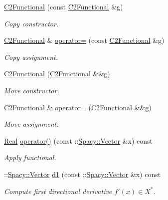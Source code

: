 \begin{DoxyCompactItemize}
\item 
\hyperlink{classSpacy_1_1FEniCS_1_1C2Functional_addb84a06f7f82969c57e5bf1b65f2b68}{C2\-Functional} (const \hyperlink{classSpacy_1_1FEniCS_1_1C2Functional}{C2\-Functional} \&g)
\begin{DoxyCompactList}\small\item\em Copy constructor. \end{DoxyCompactList}\item 
\hyperlink{classSpacy_1_1FEniCS_1_1C2Functional}{C2\-Functional} \& \hyperlink{classSpacy_1_1FEniCS_1_1C2Functional_ab9ff23de1e812f6782b7db6ec01e0f4c}{operator=} (const \hyperlink{classSpacy_1_1FEniCS_1_1C2Functional}{C2\-Functional} \&g)
\begin{DoxyCompactList}\small\item\em Copy assignment. \end{DoxyCompactList}\item 
\hyperlink{classSpacy_1_1FEniCS_1_1C2Functional_af9ac63335fc062d18e08fa186312b5a2}{C2\-Functional} (\hyperlink{classSpacy_1_1FEniCS_1_1C2Functional}{C2\-Functional} \&\&g)
\begin{DoxyCompactList}\small\item\em Move constructor. \end{DoxyCompactList}\item 
\hyperlink{classSpacy_1_1FEniCS_1_1C2Functional}{C2\-Functional} \& \hyperlink{classSpacy_1_1FEniCS_1_1C2Functional_a96a909732f7f098d67ee5eba20406337}{operator=} (\hyperlink{classSpacy_1_1FEniCS_1_1C2Functional}{C2\-Functional} \&\&g)
\begin{DoxyCompactList}\small\item\em Move assignment. \end{DoxyCompactList}\item 
\hyperlink{classSpacy_1_1Real}{Real} \hyperlink{classSpacy_1_1FEniCS_1_1C2Functional_abbf25dfc8e8c40edd3ac2dfb61030599}{operator()} (const \-::\hyperlink{classSpacy_1_1Vector}{Spacy\-::\-Vector} \&x) const 
\begin{DoxyCompactList}\small\item\em Apply functional. \end{DoxyCompactList}\item 
\-::\hyperlink{classSpacy_1_1Vector}{Spacy\-::\-Vector} \hyperlink{classSpacy_1_1FEniCS_1_1C2Functional_ab9b10dc982f81093c3125027b46c5876}{d1} (const \-::\hyperlink{classSpacy_1_1Vector}{Spacy\-::\-Vector} \&x) const 
\begin{DoxyCompactList}\small\item\em Compute first directional derivative $f'(x) \in X^* $. \end{DoxyCompactList}\item 

\end{DoxyCompactItemize}
